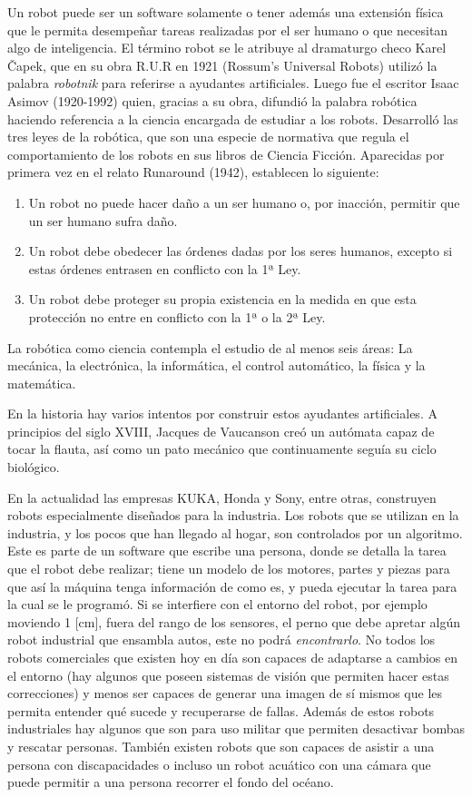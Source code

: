 Un robot puede ser un software solamente o tener además una extensión física que le permita desempeñar tareas realizadas por el ser humano o que necesitan algo de inteligencia. El término robot se le atribuye al dramaturgo checo Karel Čapek, que en su obra R.U.R en 1921 (Rossum’s Universal Robots) utilizó la palabra \textit{robotnik} para referirse a ayudantes artificiales. Luego fue el escritor Isaac Asimov (1920-1992) quien,  gracias a su obra, difundió la palabra robótica haciendo referencia a la ciencia encargada de estudiar a los robots. Desarrolló las tres leyes de la robótica, que son una especie de normativa que regula el comportamiento de los robots en sus libros de Ciencia Ficción. Aparecidas por primera vez en el relato Runaround (1942), establecen lo siguiente:

\begin{enumerate}
\item Un robot no puede hacer daño a un ser humano o, por inacción, permitir que un ser humano sufra daño.
\item Un robot debe obedecer las órdenes dadas por los seres humanos, excepto si estas órdenes entrasen en conflicto con la 1ª Ley.
\item Un robot debe proteger su propia existencia en la medida en que esta protección no entre en conflicto con la 1ª o la 2ª Ley.
\end{enumerate}
La robótica como ciencia contempla el estudio de al menos seis áreas: La mecánica, la electrónica, la informática, el control automático, la física y la matemática.

En la historia hay varios intentos por construir estos ayudantes artificiales. A principios del siglo XVIII, Jacques de Vaucanson creó un autómata capaz de tocar la flauta, así como un pato mecánico que continuamente seguía su ciclo biológico.

En la actualidad las empresas KUKA, Honda y Sony, entre otras, construyen robots especialmente diseñados para la industria. Los robots que se utilizan en la industria, y los pocos que han llegado al hogar, son controlados por un algoritmo. Este es parte de un software que escribe una persona, donde se detalla la tarea que el robot debe realizar; tiene un modelo de los motores, partes y piezas para que así la máquina tenga información de como es, y pueda ejecutar la tarea para la cual se le programó. Si se interfiere con el entorno del robot, por ejemplo moviendo 1 [cm], fuera del rango de los sensores, el perno que debe apretar algún robot industrial que ensambla autos, este no podrá \textit{encontrarlo}. No todos los robots comerciales que existen hoy en día son capaces de adaptarse a cambios en el entorno (hay algunos que poseen sistemas de visión que permiten hacer estas correcciones) y menos ser capaces de generar una imagen de sí mismos que les permita entender qué sucede y recuperarse de fallas. Además de estos robots industriales hay algunos que son para uso militar que permiten desactivar bombas y rescatar personas. También existen robots que son capaces de asistir a una persona con discapacidades o incluso un robot acuático con una cámara que puede permitir a una persona recorrer el fondo del océano. 

